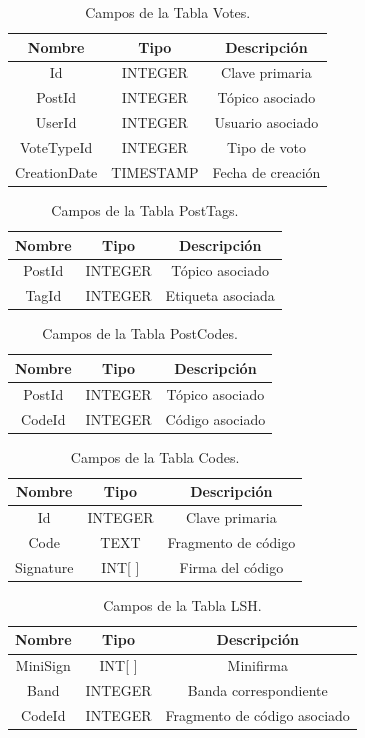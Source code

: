 \begin{table}[h]
\caption{Campos de la Tabla Votes.}
\centering
\begin{tabular}{ccc}
\hline
Nombre & Tipo & Descripción \\
\hline
Id & INTEGER & Clave primaria \\
PostId & INTEGER & Tópico asociado \\
UserId & INTEGER & Usuario asociado \\ 
VoteTypeId & INTEGER & Tipo de voto \\
CreationDate & TIMESTAMP & Fecha de creación \\
\hline
\end{tabular}
\end{table}

\newpage
\newpage
\newpage
\FloatBarrier
\begin{table}[H]
\caption{Campos de la Tabla PostTags.}
\centering
\begin{tabular}{ccc}
\hline
Nombre & Tipo & Descripción \\
\hline
PostId & INTEGER & Tópico asociado \\
TagId & INTEGER & Etiqueta asociada \\ 
\hline
\end{tabular}
\end{table}

\begin{table}[H]
\caption{Campos de la Tabla PostCodes.}
\centering
\begin{tabular}{ccc}
\hline
Nombre & Tipo & Descripción \\
\hline
PostId & INTEGER & Tópico asociado \\
CodeId & INTEGER & Código asociado \\ 
\hline
\end{tabular}
\end{table}

\begin{table}[H]
\caption{Campos de la Tabla Codes.}
\centering
\begin{tabular}{ccc}
\hline
Nombre & Tipo & Descripción \\
\hline
Id & INTEGER & Clave primaria \\
Code & TEXT & Fragmento de código \\
Signature & INT[ ] & Firma del código \\
\hline
\end{tabular}
\end{table}

\begin{table}[H]
\caption{Campos de la Tabla LSH.}
\centering
\begin{tabular}{ccc}
\hline
Nombre & Tipo & Descripción \\
\hline
MiniSign & INT[ ] & Minifirma \\
Band & INTEGER & Banda correspondiente \\
CodeId & INTEGER & Fragmento de código asociado \\
\hline
\end{tabular}
\end{table}